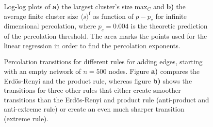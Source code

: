\documentclass{scrartcl}
\begin{document}
\begin{figure}
    \caption{Log-log plots of \textbf{a)} the largest cluster's size
        $\mathrm{max}_C$ and \textbf{b)} the average finite cluster size
        $\langle s\rangle^\mathrm{f}$ as function of $p-p_c$ for infinite dimensional
        percolation, where $p_c=0.004$ is the theoretic prediction of the
        percolation threshold. The area marks the points used for the linear
        regression in order to find the percolation exponents.}
    \label{fig:32_infty}
\end{figure}

\begin{figure}
    \caption{Percolation transitions for different rules for adding edges,
        starting with an empty network of $n=500$ nodes. Figure \textbf{a)}
        compares the Erdös-Renyi and the product rule, whereas figure
        \textbf{b)} shows the transitions for three other rules that either create
        smoother transitions than the Erdös-Renyi and product rule
        (anti-product and anti-extreme rule) or create an even much sharper
        transition (extreme rule). }
    \label{fig:33_perc}
\end{figure}
\end{document}
